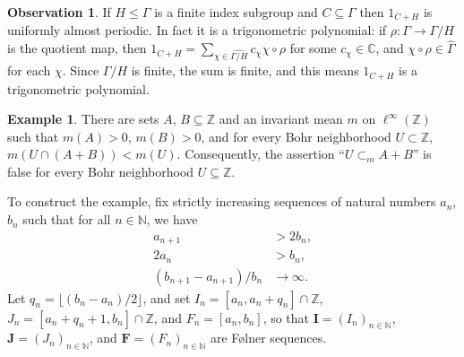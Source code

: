 \documentclass[12pt]{amsart} \usepackage{amsmath,centernot,amssymb,leftindex}
\newcommand{\mb}{\mathbf}
\numberwithin{theorem}{section}
\numberwithin{equation}{section}
\theoremstyle{definition}
\newtheorem{observation}[theorem]{Observation}
\newtheorem{example}[theorem]{Example}
\begin{document}
	\begin{observation} If $H\leq \Gamma$ is a finite index subgroup and $C\subseteq \Gamma$ then $1_{C+H}$ is uniformly almost periodic.  In fact it is a trigonometric polynomial: if $\rho:\Gamma \to \Gamma/H$ is the quotient map, then $1_{C+H}=\sum_{\chi\in \widehat{\Gamma/H}} c_{\chi} \chi\circ \rho$ for some $c_{\chi}\in \mathbb C$, and $\chi \circ \rho\in \widehat{\Gamma}$ for each $\chi$.  Since $\Gamma/H$ is finite, the sum is finite, and this means $1_{C+H}$ is a trigonometric polynomial.
\end{observation}	
	
\begin{example}\label{ex:NeedExtreme}
There are sets $A$, $B\subseteq \mathbb Z$ and an invariant mean $m$ on $\ell^{\infty}(\mathbb Z)$ such that $m(A)>0$, $m(B)>0$, and for every Bohr neighborhood $U\subset \mathbb Z$, $m(U\cap (A+B))<m(U)$.  Consequently, the assertion ``$U\subset_{m} A+B$'' is false for every Bohr neighborhood $U\subseteq \mathbb Z$.
\end{example} 
	To construct the example, fix strictly increasing sequences of natural numbers $a_{n}$, $b_{n}$ such that for all $n\in \mathbb N$, we have
	\begin{align}
	\label{eq:anplus1}	a_{n+1}&>2b_{n},\\
\label{eq:2an}		2a_{n}&>b_{n},\\
\label{eq:bnplus1}		(b_{n+1}-a_{n+1})/b_{n}&\to \infty.
	\end{align} 
Let $q_{n}= \lfloor (b_{n}-a_{n})/2 \rfloor$, and set $I_{n}=[a_{n},a_{n}+q_{n}]\cap \mathbb Z$, $J_{n}=[a_{n}+q_{n}+1,b_{n}]\cap \mathbb Z$, and $F_{n}=[a_{n},b_{n}]$, so that $\mb I=(I_{n})_{n\in \mathbb N}$, $\mb J=(J_{n})_{n\in \mathbb N}$, and $\mb F= (F_{n})_{n\in \mathbb N}$ are F{\o}lner sequences.  
	
\end{document}
